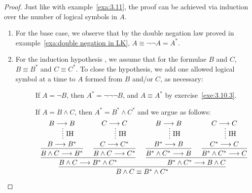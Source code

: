 \documentclass[11pt,a4paper]{article}
\begin{document}
\begin{proof}
    Just like with example~\ref{exa:3.11}, the proof can be achieved via induction over the number of logical symbols in \(A\).
    \begin{enumerate}
        \item
            For the base case, we observe that by the double negation law proved in example~\ref{exa:double negation in LK},
            \(A\equiv\lnot\lnot A = A^\ast\).
        \item
            For the induction hypothesis \IH, we assume that for the formulae \(B\) and \(C\),
            \(B\equiv B^\ast\) and \(C\equiv C^\ast\). To close the hypothesis,
            we add one allowed logical symbol at a time to \(A\) formed from \(B\) and/or \(C\),
            as necessary:
            \begin{description}
                \item[\lnot]
                    If \(A = \lnot B\), then \(A^\ast = \lnot\lnot\lnot B\),
                    and \(A\equiv A^\ast\) by exercise~\ref{exe:3.10.3}.
                \item[\land]
                    If \(A = B\land C\), then \(A^\ast = B^\ast\land C^\ast\) and we argue as follows:
                    \begin{equation*}
                        \begin{prooftree}
                            \hypo{B\seq B}
                            \ellipsis{\IH}{B\seq B^\ast}
                            \infer1{B\land C\seq B^\ast}
                            \hypo{C\seq C}
                            \ellipsis{\IH}{C\seq C^\ast}
                            \infer1{B\land C\seq C^\ast}
                            \infer2{B\land C \seq B^\ast\land C^\ast}
                            \hypo{B\seq B}
                            \ellipsis{\IH}{B^\ast\seq B}
                            \infer1{B^\ast\land C^\ast\seq B}
                            \hypo{C\seq C}
                            \ellipsis{\IH}{C^\ast\seq C}
                            \infer1{B^\ast\land C^\ast\seq C}
                            \infer2{B^\ast\land C^\ast \seq B\land C}
                            \infer2{B\land C \equiv B^\ast\land C^\ast}
                        \end{prooftree}
                    \end{equation*}
                \pagebreak
                \item[\lor]
                    \begin{exercise}\label{exe:3.12.1.iii}

\end{exercise}
\end{description}
\end{enumerate}
\end{proof}
\end{document}
